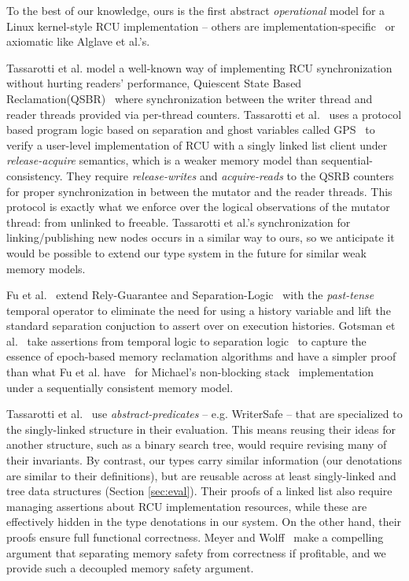 To the best of our knowledge, ours is the first abstract \emph{operational} model for a Linux kernel-style RCU implementation -- others are implementation-specific~\cite{Mandrykin:2016:TDV:3001219.3001297} or axiomatic like Alglave et al.'s.

Tassarotti et al. model a well-known way of implementing RCU synchronization without hurting readers' performance, \textsf{Quiescent State Based Reclamation}(QSBR)~\cite{urcu_ieee} where synchronization between the writer thread and reader threads provided via per-thread counters. Tassarotti et al.~\cite{verrcu} uses a protocol based program logic based on separation and ghost variables called \textsf{GPS}~\cite{Turon:2014:GNW:2660193.2660243} to verify a user-level implementation of \textsf{RCU} with a singly linked list client under \emph{release-acquire} semantics, which is a weaker memory model than sequential-consistency. They require \textit{release-writes} and \textit{acquire-reads} to the QSRB counters for proper synchronization in between the mutator and the reader threads. This protocol is exactly what we enforce over the logical observations of the mutator thread: from \textsf{unlinked} to \textsf{freeable}. 
Tassarotti et al.'s synchronization for linking/publishing new nodes occurs in a similar way to ours, so we anticipate it would be possible to extend our type system in the future for similar weak memory models.

 Fu et al.~\cite{shao_temp} extend Rely-Guarantee and Separation-Logic~\cite{vafeiadis07,Feng:2007:RCS:1762174.1762193,Feng:2009:LRR:1480881.1480922} with the \textit{past-tense} temporal operator to eliminate the need for using a history variable and lift the standard separation conjuction to assert over on execution histories. Gotsman et al.~\cite{Gotsman:2013:VCM:2450268.2450289} take assertions from temporal logic to separation logic~\cite{vafeiadis07} to capture the essence of epoch-based memory reclamation algorithms and have a simpler proof than what Fu et al. have~\cite{shao_temp} for Michael's non-blocking stack~\cite{Michael:2004:HPS:987524.987595} implementation under a sequentially consistent memory model.

Tassarotti et al.~\cite{verrcu} use \textit{abstract-predicates} -- e.g. WriterSafe -- that are specialized to the singly-linked structure in their evaluation.  This means reusing their ideas for another structure, such as a binary search tree, would require revising many of their invariants.  By contrast, our types carry similar information (our denotations are similar to their definitions), but are reusable across at least singly-linked and tree data structures (Section \ref{sec:eval}). 
Their proofs of a linked list also require managing assertions about RCU implementation resources, while these are effectively hidden in the type denotations in our system.
On the other hand, their proofs ensure full functional correctness.  Meyer and Wolff~\cite{myr} make a compelling argument that separating memory safety from correctness if profitable, and we provide such a decoupled memory safety argument. 


